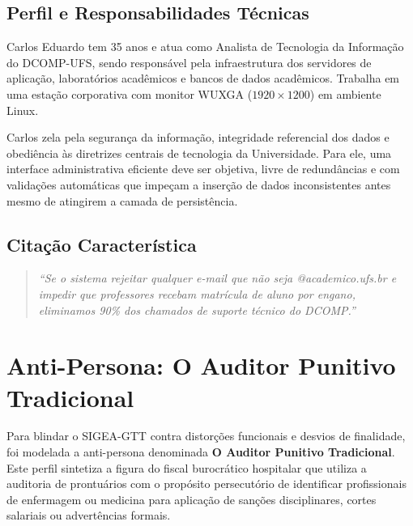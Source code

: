 \subsection{Perfil e Responsabilidades Técnicas}
Carlos Eduardo tem 35 anos e atua como Analista de Tecnologia da Informação do DCOMP-UFS, sendo responsável pela infraestrutura dos servidores de aplicação, laboratórios acadêmicos e bancos de dados acadêmicos. Trabalha em uma estação corporativa com monitor WUXGA ($1920 \times 1200$) em ambiente Linux.

Carlos zela pela segurança da informação, integridade referencial dos dados e obediência às diretrizes centrais de tecnologia da Universidade. Para ele, uma interface administrativa eficiente deve ser objetiva, livre de redundâncias e com validações automáticas que impeçam a inserção de dados inconsistentes antes mesmo de atingirem a camada de persistência.

\subsection{Citação Característica}
\begin{quote}
\textit{``Se o sistema rejeitar qualquer e-mail que não seja @academico.ufs.br e impedir que professores recebam matrícula de aluno por engano, eliminamos 90\% dos chamados de suporte técnico do DCOMP.''}
\end{quote}

\section{Anti-Persona: O Auditor Punitivo Tradicional}
\label{sec_anti_persona}

Para blindar o SIGEA-GTT contra distorções funcionais e desvios de finalidade, foi modelada a anti-persona denominada \textbf{O Auditor Punitivo Tradicional}. Este perfil sintetiza a figura do fiscal burocrático hospitalar que utiliza a auditoria de prontuários com o propósito persecutório de identificar profissionais de enfermagem ou medicina para aplicação de sanções disciplinares, cortes salariais ou advertências formais.

